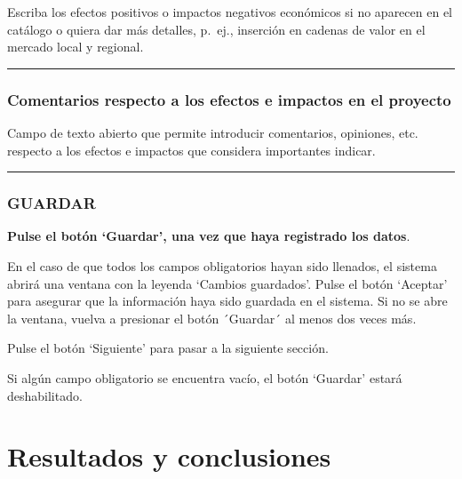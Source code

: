 \documentclass[
]{book}
\begin{document}
Escriba los efectos positivos o impactos negativos económicos si no aparecen en el catálogo o quiera dar más detalles, p.~ej., inserción en cadenas de valor en el mercado local y regional.

\begin{center}\rule{0.5\linewidth}{0.5pt}\end{center}

\hypertarget{comentarios-respecto-a-los-efectos-e-impactos-en-el-proyecto}{%
\subsection*{Comentarios respecto a los efectos e impactos en el proyecto}\label{comentarios-respecto-a-los-efectos-e-impactos-en-el-proyecto}}

Campo de texto abierto que permite introducir comentarios, opiniones, etc. respecto a los efectos e impactos que considera importantes indicar.

\begin{center}\rule{0.5\linewidth}{0.5pt}\end{center}

\hypertarget{guardar-7}{%
\subsection*{GUARDAR}\label{guardar-7}}

\textbf{Pulse el botón `Guardar', una vez que haya registrado los datos}.

En el caso de que todos los campos obligatorios hayan sido llenados, el sistema abrirá una ventana con la leyenda `Cambios guardados'. Pulse el botón `Aceptar' para asegurar que la información haya sido guardada en el sistema. Si no se abre la ventana, vuelva a presionar el botón ´Guardar´ al menos dos veces más.

Pulse el botón `Siguiente' para pasar a la siguiente sección.

Si algún campo obligatorio se encuentra vacío, el botón `Guardar' estará deshabilitado.

\hypertarget{resultados-y-conclusiones}{%
\chapter*{Resultados y conclusiones}\label{resultados-y-conclusiones}}
\end{document}

